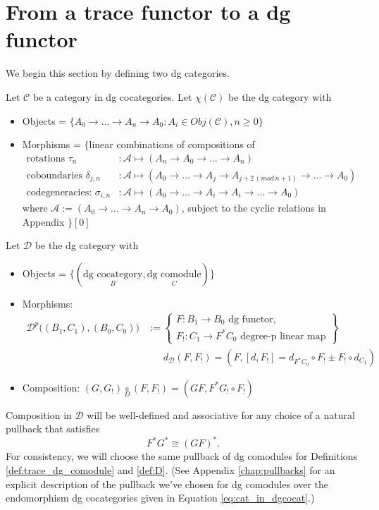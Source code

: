 \section{From a trace functor to a dg functor} \label{sec:trace_to_dg}
We begin this section by defining two dg 
categories.

\begin{defn} \label{def:chi}
Let $\mathcal{C}$ be a category in dg cocategories. 
Let $\chi(\mathcal{C})$ be the dg category with
\begin{itemize}
	\item Objects = $\{A_0 \to \dots \to A_n \to A_0: A_i \in Obj(\mathcal{C}), n\geq 0\}$
	\item Morphisms = $\{$linear combinations of compositions of 
	\begin{align*}
	\textrm{rotations } \tau_n
	&: 
	\mathcal{A}
	\mapsto (A_n \to A_0 \to \dots \to A_n) \\
	\textrm{coboundaries } \delta_{j,n}
	&: 
	\mathcal{A}\mapsto 
	(A_0 \to \dots \to A_j \to A_{j+2\,(mod\,n+1)} 
	\to \dots \to A_0) \\
	\textrm{codegeneracies: } \sigma_{i,n}
	&: \mathcal{A}
	\mapsto 
	(A_0 \to \dots \to A_i \to A_i \to \dots \to A_0)
	\end{align*}
	where $\mathcal{A}:= (A_0 \to \dots \to A_n \to A_0)$,
	subject to the cyclic relations in Appendix \label{chap:lambda}$\}[0]$
\end{itemize}
\end{defn}
%
\begin{defn} \label{def:D}
Let $\mathcal{D}$ be the dg category with 
\begin{itemize}
	\item Objects = $\{(\underset{B}{\textrm{dg cocategory}}, 
	\underset{C}{\textrm{dg comodule}})\}$
	\item Morphisms:
	\begin{align*}
	\mathcal{D}^p \big((B_1, C_1), (B_0,C_0) \big)
	&:= 
	\begin{Bmatrix}
	F: B_1 \to B_0 \textrm{ dg functor,}\\
	F_!: C_1 \to F^*C_0 \textrm{ degree-p linear map}
	\end{Bmatrix}\\
	&\phantom{:=}
	d_{\mathcal{D}}(F, F_!) = 
	(F, [d,F_!] = 
	d_{F^*C_0}\circ F_! \pm F_! \circ d_{C_1})
	\end{align*}
	\item Composition: $(G, G_!) \underset{D}{\circ} (F, F_!) 
	= (GF, F^*G_! \circ F_!)$
\end{itemize}
\end{defn}
%
Composition in $\mathcal{D}$ will be well-defined 
and associative for any choice of a natural pullback 
that satisfies
\begin{equation} \label{eq:pullback_yoga}
F^*G^* \cong (GF)^*.
\end{equation}
For consistency, we will choose the same pullback of 
dg comodules for Definitions \ref{def:trace_dg_comodule} 
and \ref{def:D}. (See Appendix \ref{chap:pullbacks} for an 
explicit description of 
the pullback we've chosen for dg comodules over the 
endomorphism dg cocategories given in Equation 
\ref{eq:cat_in_dgcocat}.)
%


